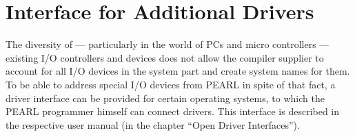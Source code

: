 \section{Interface for Additional Drivers}   %
\label{sec_driver_interface}

The diversity of --- particularly in the world of PCs 
and micro controllers --- existing I/O
controllers and devices does not allow the compiler supplier to account
for all I/O devices in the system part and create system names for them.
To be able to address special I/O devices from PEARL in spite of that
fact, a driver interface can be provided for certain operating systems,
to which the PEARL programmer himself can connect drivers. This
interface is described in the respective user manual (in the chapter
``Open Driver Interfaces'').


